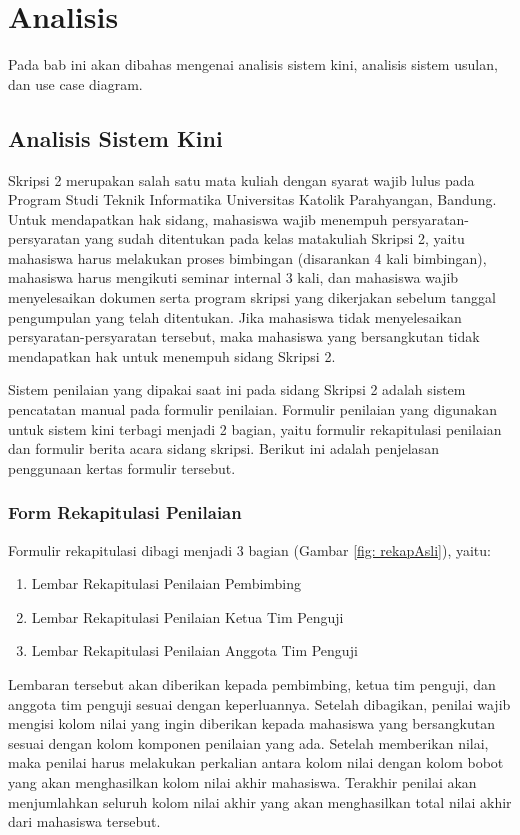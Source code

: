 \chapter{Analisis}
\label{chap: analisis}

Pada bab ini akan dibahas mengenai analisis sistem kini, analisis sistem usulan, dan use case diagram.

\section{Analisis Sistem Kini}
\label{sec: analisiSKini}

Skripsi 2 merupakan salah satu mata kuliah dengan syarat wajib lulus pada Program Studi Teknik Informatika Universitas Katolik Parahyangan, Bandung. Untuk mendapatkan hak sidang, mahasiswa wajib menempuh persyaratan-persyaratan yang sudah ditentukan pada kelas matakuliah Skripsi 2, yaitu mahasiswa harus melakukan proses bimbingan (disarankan 4 kali bimbingan), mahasiswa harus mengikuti seminar internal 3 kali, dan mahasiswa wajib menyelesaikan dokumen serta program skripsi yang dikerjakan sebelum tanggal pengumpulan yang telah ditentukan. Jika mahasiswa tidak menyelesaikan persyaratan-persyaratan tersebut, maka mahasiswa yang bersangkutan tidak mendapatkan hak untuk menempuh sidang Skripsi 2.

Sistem penilaian yang dipakai saat ini pada sidang Skripsi 2 adalah sistem pencatatan manual pada formulir penilaian. Formulir penilaian yang digunakan untuk sistem kini terbagi menjadi 2 bagian, yaitu formulir rekapitulasi penilaian dan formulir berita acara sidang skripsi. Berikut ini adalah penjelasan penggunaan kertas formulir tersebut.

	\subsection{Form Rekapitulasi Penilaian}
	\label{sub: rekapPenil}
	
	Formulir rekapitulasi dibagi menjadi 3 bagian (Gambar \ref{fig: rekapAsli}), yaitu:
		\begin{enumerate}
			\item Lembar Rekapitulasi Penilaian Pembimbing
			\item Lembar Rekapitulasi Penilaian Ketua Tim Penguji
			\item Lembar Rekapitulasi Penilaian Anggota Tim Penguji
		\end{enumerate}
	
	Lembaran tersebut akan diberikan kepada pembimbing, ketua tim penguji, dan anggota tim penguji sesuai dengan keperluannya. Setelah dibagikan, penilai wajib mengisi kolom nilai yang ingin diberikan kepada mahasiswa yang bersangkutan sesuai dengan kolom komponen penilaian yang ada. Setelah memberikan nilai, maka penilai harus melakukan perkalian antara kolom nilai dengan kolom bobot yang akan menghasilkan kolom nilai akhir mahasiswa. Terakhir penilai akan menjumlahkan seluruh kolom nilai akhir yang akan menghasilkan total nilai akhir dari mahasiswa tersebut.
	
